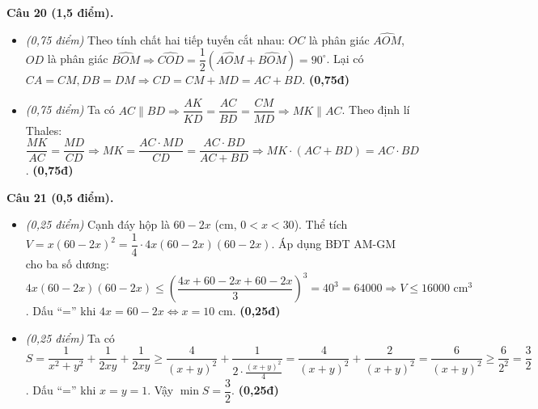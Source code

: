 \documentclass[11pt,a4paper]{article}
\begin{document}
\vspace{1mm}
\textbf{Câu 20 (1,5 điểm).}
\begin{itemize}
  \item[a)] \textit{(0,75 điểm)} Theo tính chất hai tiếp tuyến cắt nhau: $OC$ là phân giác $\widehat{AOM}$, $OD$ là phân giác $\widehat{BOM} \Rightarrow \widehat{COD} = \dfrac{1}{2}(\widehat{AOM} + \widehat{BOM}) = 90^\circ$. Lại có $CA = CM, DB = DM \Rightarrow CD = CM + MD = AC + BD$. \hfill \textbf{(0,75đ)}
  \item[b)] \textit{(0,75 điểm)} Ta có $AC \parallel BD \Rightarrow \dfrac{AK}{KD} = \dfrac{AC}{BD} = \dfrac{CM}{MD} \Rightarrow MK \parallel AC$. Theo định lí Thales: $\dfrac{MK}{AC} = \dfrac{MD}{CD} \Rightarrow MK = \dfrac{AC \cdot MD}{CD} = \dfrac{AC \cdot BD}{AC + BD} \Rightarrow MK \cdot (AC + BD) = AC \cdot BD$. \hfill \textbf{(0,75đ)}
\end{itemize}

\vspace{1mm}
\textbf{Câu 21 (0,5 điểm).}
\begin{itemize}
  \item[a)] \textit{(0,25 điểm)} Cạnh đáy hộp là $60 - 2x$ (cm, $0 < x < 30$). Thể tích $V = x(60 - 2x)^2 = \dfrac{1}{4} \cdot 4x(60 - 2x)(60 - 2x)$. Áp dụng BĐT AM-GM cho ba số dương:
  $4x(60 - 2x)(60 - 2x) \le \left(\dfrac{4x + 60 - 2x + 60 - 2x}{3}\right)^3 = 40^3 = 64000 \Rightarrow V \le 16000\text{ cm}^3$. Dấu ``='' khi $4x = 60 - 2x \Leftrightarrow x = 10\text{ cm}$. \hfill \textbf{(0,25đ)}
  \item[b)] \textit{(0,25 điểm)} Ta có $S = \dfrac{1}{x^2 + y^2} + \dfrac{1}{2xy} + \dfrac{1}{2xy} \ge \dfrac{4}{(x+y)^2} + \dfrac{1}{2 \cdot \frac{(x+y)^2}{4}} = \dfrac{4}{(x+y)^2} + \dfrac{2}{(x+y)^2} = \dfrac{6}{(x+y)^2} \ge \dfrac{6}{2^2} = \dfrac{3}{2}$. Dấu ``='' khi $x = y = 1$. Vậy $\min S = \dfrac{3}{2}$. \hfill \textbf{(0,25đ)}
\end{itemize}
\end{document}
